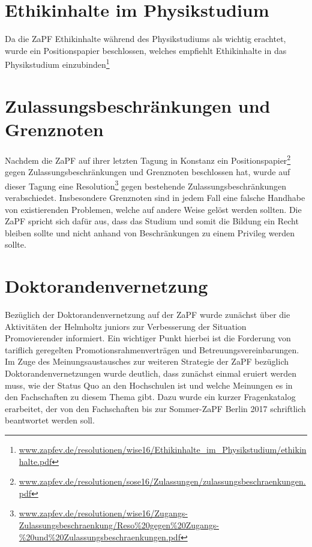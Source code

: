 \section*{Ethikinhalte im Physikstudium}
Da die ZaPF Ethikinhalte während des Physikstudiums als wichtig erachtet, wurde ein Positionspapier beschlossen, welches empfiehlt Ethikinhalte in das 
Physikstudium einzubinden\footnote{\href{https://zapfev.de/resolutionen/wise16/Ethikinhalte_im_Physikstudium/ethikinhalte.pdf}{\url{www.zapfev.de/resolutionen/wise16/Ethikinhalte_im_Physikstudium/ethikinhalte.pdf}}}

\section*{Zulassungsbeschränkungen und Grenznoten}
Nachdem  die ZaPF auf ihrer letzten Tagung in Konstanz ein Positionspapier\footnote{\href{https://zapfev.de/resolutionen/sose16/Zulassungen/zulassungsbeschraenkungen.pdf}{\url{www.zapfev.de/resolutionen/sose16/Zulassungen/zulassungsbeschraenkungen.pdf}}} 
gegen Zulassungsbeschränkungen und Grenznoten beschlossen hat, wurde auf dieser Tagung eine Resolution\footnote{\href{https://zapfev.de/resolutionen/wise16/Zugangs-Zulassungsbeschraenkung/Reso\%20gegen\%20Zugangs-\%20und\%20Zulassungsbeschraenkungen.pdf}{\url{www.zapfev.de/resolutionen/wise16/Zugangs-Zulassungsbeschraenkung/Reso\%20gegen\%20Zugangs-\%20und\%20Zulassungsbeschraenkungen.pdf}}} 
gegen bestehende Zulassungsbeschränkungen verabschiedet. Insbesondere Grenznoten sind in jedem Fall eine falsche Handhabe von existierenden  Problemen, welche auf 
andere Weise gelöst werden sollten. Die ZaPF spricht sich dafür aus, dass das Studium und somit die Bildung ein Recht bleiben sollte und nicht anhand von 
Beschränkungen zu einem Privileg werden sollte.
		
\section*{Doktorandenvernetzung}
Bezüglich der Doktorandenvernetzung auf der ZaPF wurde zunächst über die Aktivitäten der Helmholtz juniors zur Verbesserung der Situation Promovierender informiert. 
Ein wichtiger Punkt hierbei ist die Forderung von tariflich geregelten Promotionsrahmenverträgen und  Betreuungsvereinbarungen. \\
Im Zuge des Meinungsaustausches zur weiteren Strategie der ZaPF bezüglich Doktorandenvernetzungen wurde deutlich, dass zunächst einmal eruiert werden muss, wie der 
Status Quo an den Hochschulen ist und welche Meinungen es in den Fachschaften zu diesem Thema gibt. Dazu wurde ein kurzer Fragenkatalog erarbeitet, der von den 
Fachschaften bis zur Sommer-ZaPF Berlin 2017 schriftlich beantwortet werden soll. 
		
